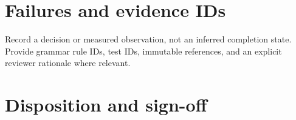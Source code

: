 \documentclass[11pt,letterpaper]{article}
\begin{document}
\section{Failures and evidence IDs}
Record a decision or measured observation, not an inferred completion state. Provide grammar rule IDs, test IDs, immutable references, and an explicit reviewer rationale where relevant.
\section{Disposition and sign-off}
\end{document}
